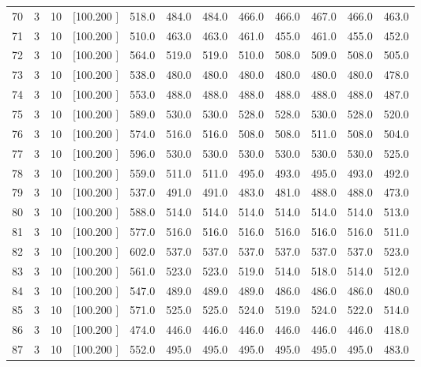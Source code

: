 \documentclass[12pt,a4paper]{article}
\begin{document}
\begin{center}
{\begin{tabular}{r r r r r r r r r r r r}
  70&  3& 10&[100.200   ]&   518.0&   484.0&   484.0&   466.0&   466.0&   467.0&   466.0&   463.0\\[-0.02in]
  71&  3& 10&[100.200   ]&   510.0&   463.0&   463.0&   461.0&   455.0&   461.0&   455.0&   452.0\\[-0.02in]
  72&  3& 10&[100.200   ]&   564.0&   519.0&   519.0&   510.0&   508.0&   509.0&   508.0&   505.0\\[-0.02in]
  73&  3& 10&[100.200   ]&   538.0&   480.0&   480.0&   480.0&   480.0&   480.0&   480.0&   478.0\\[-0.02in]
  74&  3& 10&[100.200   ]&   553.0&   488.0&   488.0&   488.0&   488.0&   488.0&   488.0&   487.0\\[-0.02in]
  75&  3& 10&[100.200   ]&   589.0&   530.0&   530.0&   528.0&   528.0&   530.0&   528.0&   520.0\\[-0.02in]
  76&  3& 10&[100.200   ]&   574.0&   516.0&   516.0&   508.0&   508.0&   511.0&   508.0&   504.0\\[-0.02in]
  77&  3& 10&[100.200   ]&   596.0&   530.0&   530.0&   530.0&   530.0&   530.0&   530.0&   525.0\\[-0.02in]
  78&  3& 10&[100.200   ]&   559.0&   511.0&   511.0&   495.0&   493.0&   495.0&   493.0&   492.0\\[-0.02in]
  79&  3& 10&[100.200   ]&   537.0&   491.0&   491.0&   483.0&   481.0&   488.0&   488.0&   473.0\\[-0.02in]
  80&  3& 10&[100.200   ]&   588.0&   514.0&   514.0&   514.0&   514.0&   514.0&   514.0&   513.0\\[-0.02in]
  81&  3& 10&[100.200   ]&   577.0&   516.0&   516.0&   516.0&   516.0&   516.0&   516.0&   511.0\\[-0.02in]
  82&  3& 10&[100.200   ]&   602.0&   537.0&   537.0&   537.0&   537.0&   537.0&   537.0&   523.0\\[-0.02in]
  83&  3& 10&[100.200   ]&   561.0&   523.0&   523.0&   519.0&   514.0&   518.0&   514.0&   512.0\\[-0.02in]
  84&  3& 10&[100.200   ]&   547.0&   489.0&   489.0&   489.0&   486.0&   486.0&   486.0&   480.0\\[-0.02in]
  85&  3& 10&[100.200   ]&   571.0&   525.0&   525.0&   524.0&   519.0&   524.0&   522.0&   514.0\\[-0.02in]
  86&  3& 10&[100.200   ]&   474.0&   446.0&   446.0&   446.0&   446.0&   446.0&   446.0&   418.0\\[-0.02in]
  87&  3& 10&[100.200   ]&   552.0&   495.0&   495.0&   495.0&   495.0&   495.0&   495.0&   483.0\\[-0.02in]

\end{tabular}}
\end{center}
\end{document}
